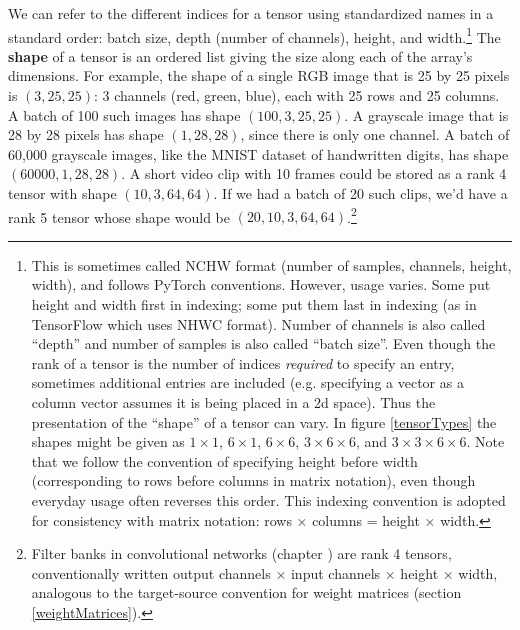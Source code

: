 We can refer to the different indices for a tensor using standardized names in a standard order: batch size, depth (number of channels), height, and width.\footnote{This is sometimes called NCHW format (number of samples, channels, height, width), and follows PyTorch conventions. However, usage varies. Some put height and width first in indexing; some put them last in indexing (as in TensorFlow which uses NHWC format). Number of channels is also called ``depth'' and number of samples is also called ``batch size''. Even though the rank of a tensor is the number of indices \emph{required} to specify an entry, sometimes additional entries are included (e.g. specifying a vector as a column vector assumes it is being placed in a 2d space). Thus the presentation of the ``shape'' of a tensor can vary. In figure \ref{tensorTypes} the shapes might be given as $1 \times 1$, $6 \times 1$, $6 \times 6$, $3 \times 6 \times 6$, and $3 \times 3 \times 6 \times 6$. Note that we follow the convention of specifying height before width (corresponding to rows before columns in matrix notation), even though everyday usage often reverses this order. This indexing convention is adopted for consistency with matrix notation: rows × columns = height × width.} The \textbf{shape} of a tensor is an ordered list giving the size along each of the array's dimensions. For example, the shape of a single RGB image that is 25 by 25 pixels is $(3, 25, 25)$: 3 channels (red, green, blue), each with 25 rows and 25 columns. A batch of 100 such images has shape $(100, 3, 25, 25)$. A grayscale image that is 28 by 28 pixels has shape $(1, 28, 28)$, since there is only one channel. A batch of 60,000 grayscale images, like the MNIST dataset of handwritten digits, has shape $(60000, 1, 28, 28)$. A short video clip with 10 frames could be stored as a rank 4 tensor with shape $(10, 3, 64, 64)$. If we had a batch of 20 such clips, we'd have a rank 5 tensor whose shape would be $(20, 10, 3, 64, 64)$.\footnote{Filter banks in convolutional networks (chapter ) are rank 4 tensors, conventionally written output channels $\times$ input channels $\times$ height $\times$ width, analogous to the target-source convention for weight matrices (section \ref{weightMatrices}).}

